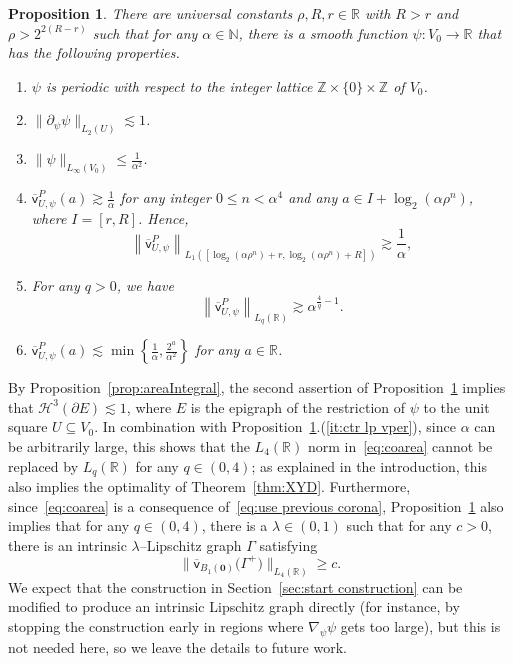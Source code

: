\documentclass[11pt,reqno]{amsart}
\newcommand{\N}{\mathbb{N}}
\newcommand{\R}{\mathbb{R}}
\newcommand{\Z}{\mathbb{Z}}
\newcommand{\cH}{\mathcal{H}}
\newcommand{\0}{\mathbf{0}}
\renewcommand{\1}{\mathbf 1}
\newcommand{\from}{\colon}
\renewcommand{\subset}{\subseteq}
\renewcommand{\ge}{\geqslant}
\renewcommand{\le}{\leqslant}
\newtheorem{prop}[thm]{Proposition}
\theoremstyle{remark}
\newcommand{\vpfl}[1]{{\overline{\mathsf{v}}_{\!#1}}}
\newcommand{\vpP}[1]{{\overline{\mathsf{v}}^{P}_{\!#1}}}
\begin{document}
\begin{prop}\label{prop:counterexample function}
  There are universal constants $\rho,R,r\in \R$ with $R>r$ and $\rho>2^{2(R-r)}$ such that for any $\alpha\in \N$, there is a smooth function $\psi\from V_0\to \R$ that has the following properties.
  \begin{enumerate}
  \item\label{it:ctr periodic}
    $\psi$ is periodic with respect to the integer lattice $\Z\times \{0\}\times \Z$ of $V_0$.
  \item\label{it:ctr horiz bound}
    $\|\partial_\psi \psi\|_{L_2(U)}\lesssim 1$.
  \item \label{it:ctr linf}
    $\|\psi\|_{L_\infty(V_0)}\le \frac{1}{\alpha^2}$.
  \item \label{it:ctr interval lower}
    $\vpP{U,\psi}(a)\gtrsim \frac{1}{\alpha}$ for any integer $0\le n<\alpha^4$ and any $a\in I+  \log_2(\alpha\rho^{n})$, where $I=[r,R]$. Hence,
    $$\left\|\vpP{U,\psi}\right\|_{L_1([\log_2(\alpha\rho^{n})+r,\log_2(\alpha\rho^{n})+R])}\gtrsim \frac{1}{\alpha},$$
  \item \label{it:ctr lp vper}
    For any $q>0$, we have
    \begin{equation*}\label{eq:q=4 critical}\left\|\vpP{U,\psi}\right\|_{L_q(\R)} \gtrsim  \alpha^{\frac{4}{q}-1}.\end{equation*}
    \item $\vpP{U,\psi}(a)\lesssim \min\left\{\frac{1}{\alpha},\frac{2^a}{\alpha^2}\right\}$ for any $a\in \R$.
  \end{enumerate}
\end{prop}


By Proposition~\ref{prop:areaIntegral}, the second assertion of Proposition~\ref{prop:counterexample function} implies that $\cH^3(\partial E)\lesssim 1$, where $E$ is the epigraph of the restriction of $\psi$ to the unit square $U\subset V_0$.  In combination with Proposition~\ref{prop:counterexample function}.(\ref{it:ctr lp vper}), since $\alpha$ can be arbitrarily large, this shows that the $L_4(\R)$ norm in~\eqref{eq:coarea} cannot be replaced by $L_q(\R)$ for any $q\in (0,4)$; as explained in the introduction, this also implies the optimality of Theorem~\ref{thm:XYD}. Furthermore, since~\eqref{eq:coarea} is a consequence of~\eqref{eq:use previous corona}, Proposition~\ref{prop:counterexample function} also implies that for any $q\in (0,4)$, there is a $\lambda\in (0,1)$ such that for any $c>0$, there is an intrinsic $\lambda$--Lipschitz graph $\Gamma$ satisfying
$$\big\|\vpfl{B_1(\0)}\big(\Gamma^+\big)\big\|_{L_4(\R)}\ge c.$$
We expect that the construction in Section~\ref{sec:start construction} can be modified to produce an intrinsic Lipschitz graph directly (for instance, by stopping the construction early in regions where $\nabla_\psi \psi$ gets too large), but this is not needed here, so we leave the details to future work.
\end{document}
